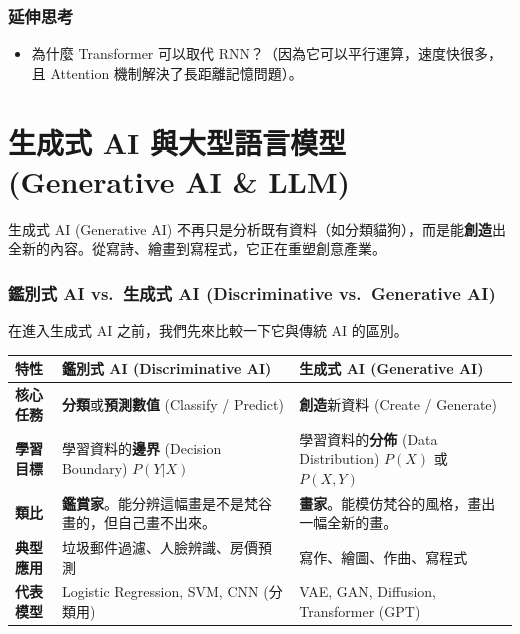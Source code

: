 \documentclass[
  letterpaper,
  DIV=11,
  numbers=noendperiod]{scrreprt}
\providecommand{\tightlist}{%
  \setlength{\itemsep}{0pt}\setlength{\parskip}{0pt}}
\begin{document}
\section{延伸思考}\label{ux5ef6ux4f38ux601dux8003-6}

\begin{itemize}
\tightlist
\item
  為什麼 Transformer 可以取代 RNN？（因為它可以平行運算，速度快很多，且
  Attention 機制解決了長距離記憶問題）。
\end{itemize}

\part{生成式 AI 與大型語言模型 (Generative AI \&
LLM)}\label{ux751fux6210ux5f0f-ai-ux8207ux5927ux578bux8a9eux8a00ux6a21ux578b-generative-ai-llm}

生成式 AI (Generative AI)
不再只是分析既有資料（如分類貓狗），而是能\textbf{創造}出全新的內容。從寫詩、繪畫到寫程式，它正在重塑創意產業。

\section{鑑別式 AI vs.~生成式 AI (Discriminative vs.~Generative
AI)}\label{ux9451ux5225ux5f0f-ai-vs.-ux751fux6210ux5f0f-ai-discriminative-vs.-generative-ai}

在進入生成式 AI 之前，我們先來比較一下它與傳統 AI 的區別。

\begin{longtable}[]{@{}
  >{\raggedright\arraybackslash}p{}
  >{\raggedright\arraybackslash}p{}
  >{\raggedright\arraybackslash}p{}@{}}
\toprule\noalign{}
\begin{minipage}[b]{\linewidth}\raggedright
特性
\end{minipage} & \begin{minipage}[b]{\linewidth}\raggedright
鑑別式 AI (Discriminative AI)
\end{minipage} & \begin{minipage}[b]{\linewidth}\raggedright
生成式 AI (Generative AI)
\end{minipage} \\
\midrule\noalign{}
\endhead
\bottomrule\noalign{}
\endlastfoot
\textbf{核心任務} & \textbf{分類}或\textbf{預測數值} (Classify /
Predict) & \textbf{創造}新資料 (Create / Generate) \\
\textbf{學習目標} & 學習資料的\textbf{邊界} (Decision Boundary)
\(P(Y|X)\) & 學習資料的\textbf{分佈} (Data Distribution) \(P(X)\) 或
\(P(X,Y)\) \\
\textbf{類比} &
\textbf{鑑賞家}。能分辨這幅畫是不是梵谷畫的，但自己畫不出來。 &
\textbf{畫家}。能模仿梵谷的風格，畫出一幅全新的畫。 \\
\textbf{典型應用} & 垃圾郵件過濾、人臉辨識、房價預測 &
寫作、繪圖、作曲、寫程式 \\
\textbf{代表模型} & Logistic Regression, SVM, CNN (分類用) & VAE, GAN,
Diffusion, Transformer (GPT) \\
\end{longtable}
\end{document}

